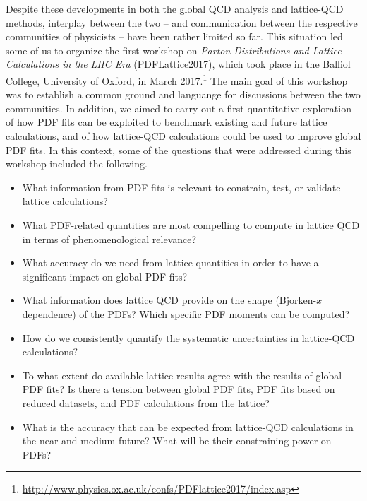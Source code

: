 Despite these developments in both the global QCD analysis and lattice-QCD 
methods, interplay between the two -- and communication between the 
respective communities of physicists -- have been rather limited so far.
%
This situation led some of us to organize the first workshop on
{\it Parton Distributions and Lattice Calculations in the LHC Era}
(PDFLattice2017), which took place in the Balliol College, University of 
Oxford, in March 2017.\footnote{\url{http://www.physics.ox.ac.uk/confs/PDFlattice2017/index.asp}}
%
The main goal of this workshop was to establish a common ground 
and languange for discussions between the two communities.
%
In addition, we aimed to carry out a first quantitative exploration of how PDF 
fits can be exploited to benchmark existing and future lattice calculations,
and of how lattice-QCD calculations could be used to improve global PDF fits.
%
In this context, some of the questions that were addressed during this workshop
included the following.
\begin{itemize}
\item What information from PDF fits is relevant to constrain, 
  test, or validate lattice calculations?

\item What PDF-related quantities are most compelling
  to compute in lattice QCD in terms of phenomenological relevance?

\item What accuracy do we need from lattice quantities 
  in order to have a significant impact on global PDF fits?

\item What information does lattice QCD provide on the
  shape (Bjorken-$x$ dependence) of the PDFs? Which specific
  PDF moments can be computed?
  
\item How do we consistently quantify the systematic uncertainties 
  in lattice-QCD calculations?

\item To what extent do available lattice results agree with the results of
  global PDF fits? Is there a tension between global PDF fits, PDF
  fits based on reduced datasets, and PDF calculations from the lattice?

\item What is the accuracy that can be expected from lattice-QCD
  calculations in the near and medium future? What will be their
  constraining power on PDFs?

\end{itemize}

